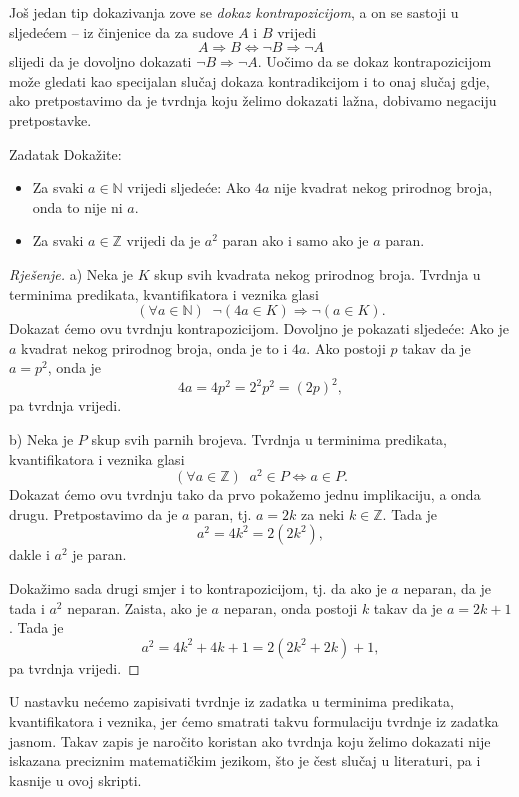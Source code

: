 Još jedan tip dokazivanja zove se \textit{dokaz kontrapozicijom}, a on se sastoji u sljedećem -- iz činjenice da za sudove \(A\) i \(B\) vrijedi 
\[A\Rightarrow B\Leftrightarrow \neg B\Rightarrow \neg A\]
slijedi da je dovoljno dokazati \(\neg B\Rightarrow \neg A\). Uočimo da se dokaz kontrapozicijom može gledati kao specijalan slučaj dokaza kontradikcijom i to onaj slučaj gdje, ako pretpostavimo da je tvrdnja koju želimo dokazati lažna, dobivamo negaciju pretpostavke.

\begin{exercise}{Zadatak}
Dokažite: \begin{itemize}
\item[a)] Za svaki \(a\in \mathbb{N}\) vrijedi sljedeće: Ako \(4a\) nije kvadrat nekog prirodnog broja, onda to nije ni \(a\).
\item[b)] Za svaki \(a\in \mathbb{Z}\) vrijedi da je \(a^2\) paran ako i samo ako je \(a\) paran.
\end{itemize}
\end{exercise}
\begin{proof}[Rješenje]
a) Neka je \(K\) skup svih kvadrata nekog prirodnog broja. Tvrdnja u terminima predikata, kvantifikatora i veznika glasi
\[(\forall a\in \mathbb{N})\;\; \neg\left(4a\in K\right)\Rightarrow \neg\left(a\in K\right).\]
Dokazat ćemo ovu tvrdnju kontrapozicijom. Dovoljno je pokazati sljedeće: Ako je \(a\) kvadrat nekog prirodnog broja, onda je to i \(4a\). Ako postoji \(p\) takav da je \(a=p^2\), onda je \[4a=4p^2=2^2p^2=(2p)^2,\] 
pa tvrdnja vrijedi.

b) Neka je \(P\) skup svih parnih brojeva. Tvrdnja u terminima predikata, kvantifikatora i veznika glasi
\[(\forall a\in \mathbb{Z})\;\; a^2\in P\Leftrightarrow a\in P.\]
Dokazat ćemo ovu tvrdnju tako da prvo pokažemo jednu implikaciju, a onda drugu. Pretpostavimo da je \(a\) paran, tj. \(a=2k\) za neki \(k\in \mathbb{Z}\). Tada je \[a^2=4k^2=2(2k^2),\] dakle i \(a^2\) je paran. 

Dokažimo sada drugi smjer i to kontrapozicijom, tj. da ako je \(a\) neparan, da je tada i \(a^2\) neparan. Zaista, ako je \(a\) neparan, onda postoji \(k\) takav da je \(a=2k+1\). Tada je \[a^2=4k^2+4k+1=2(2k^2+2k)+1,\] 
pa tvrdnja vrijedi.
\end{proof}
\begin{remark}
U nastavku nećemo zapisivati tvrdnje iz zadatka u terminima predikata, kvantifikatora i veznika, jer ćemo smatrati takvu formulaciju tvrdnje iz zadatka jasnom. Takav zapis je naročito koristan ako tvrdnja koju želimo dokazati nije iskazana preciznim matematičkim jezikom, što je čest slučaj u literaturi, pa i kasnije u ovoj skripti.
\end{remark}
